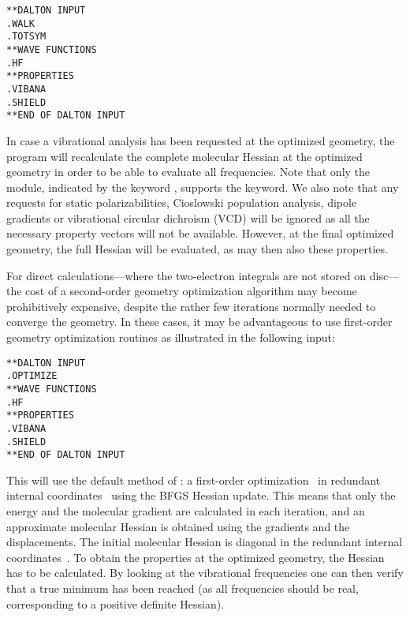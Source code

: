 \begin{verbatim}
**DALTON INPUT
.WALK
.TOTSYM
**WAVE FUNCTIONS
.HF
**PROPERTIES
.VIBANA
.SHIELD
**END OF DALTON INPUT
\end{verbatim}

In case a vibrational analysis has been requested at the optimized
geometry, the program will recalculate the complete molecular Hessian
at the optimized geometry in order to be able to evaluate all
frequencies. Note that only the  module, indicated by the
keyword , supports the  keyword.
We also note that any requests for static
polarizabilities, Cioslowski population
analysis, dipole 
gradients or vibrational circular dichroism
(VCD) will be ignored
as all the necessary property vectors will not be available. However,
at the final optimized geometry, the full Hessian will be evaluated,
as may then also these properties.

For direct calculations---where the
two-electron integrals are not stored on disc---the cost of a
second-order geometry optimization algorithm may become
prohibitively expensive, despite the rather few iterations normally
needed to converge the geometry. In these cases, it may be
advantageous to use first-order geometry
optimization routines as illustrated in the following input:

\begin{verbatim}
**DALTON INPUT
.OPTIMIZE
**WAVE FUNCTIONS
.HF
**PROPERTIES
.VIBANA
.SHIELD
**END OF DALTON INPUT
\end{verbatim}

This will use the default method of : a first-order
optimization~\cite{Fletcher} in redundant internal
coordinates~\cite{gfxfzpwtppjacs114,ppgfjcp96,vbthjcp117}
using the BFGS
Hessian update. This means that
only the energy and the molecular gradient are calculated in each iteration, and
an approximate molecular Hessian is obtained using the gradients and the
displacements. The initial molecular Hessian is diagonal in the redundant
internal coordinates~\cite{rlabgkpamcpl241}.
To obtain the properties at the optimized 
geometry, the Hessian has to be calculated. By looking at the
vibrational frequencies one can then verify that a true minimum has
been reached (as all frequencies should be real, corresponding to a
positive definite Hessian).

